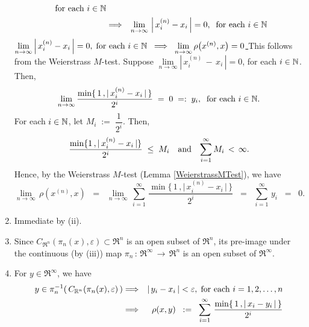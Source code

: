 \begin{enumerate}
\begin{eqnarray*}
		\;\;\textnormal{for each $i \in \mathbb{N}$}
	\\
	&\Longrightarrow& \underset{n\rightarrow\infty}{\lim}\,\left\vert\,x^{(n)}_{i} - x_{i}\,\right\vert = 0,
		\;\;\textnormal{for each $i \in \mathbb{N}$}
	\end{eqnarray*}
	\underline{$\underset{n\rightarrow\infty}{\lim}\left\vert\,x^{(n)}_{i} - x_{i}\,\right\vert = 0,\;
	\textnormal{for each $i \in \mathbb{N}$}
	\;\;\Longrightarrow\;\;
	\underset{n\rightarrow\infty}{\lim}\,\rho\!\left(x^{(n)},x\right) = 0$
	\;\mbox{}}
	\vskip 0.1cm
	\noindent
	This follows from the Weierstrass $M$-test.
	Suppose $\underset{n\rightarrow\infty}{\lim}\left\vert\,x^{(n)}_{i}\,-\,x_{i}\,\right\vert = 0$, for each $i \in \mathbb{N}$.
	Then,
	\begin{equation*}
	\lim_{n\rightarrow\infty}\dfrac{\min\{\,1\,,\vert\,x^{(n)}_{i} - x_{i}\,\vert\,\}}{2^{i}} \; = \; 0 \; =: \; y_{i},
	\;\;\textnormal{for each $i \in \mathbb{N}$}.
	\end{equation*}
	For each $i \in \mathbb{N}$, let $M_{i} \; := \; \dfrac{1}{2^{i}}$.
	Then,
	\begin{equation*}
	\dfrac{\min\{1\,,\vert\,x^{(n)}_{i} - x_{i}\,\vert\}}{2^{i}}\;\leq\;M_{i}
	\quad\textnormal{and}\quad
	\overset{\infty}{\underset{i=1}{\sum}}\,M_{i}\,<\,\infty.
	\end{equation*}
	Hence, by the Weierstrass $M$-test (Lemma \ref{WeierstrassMTest}), we have
	\begin{equation*}
 	\lim_{n\rightarrow\infty}\,\rho\!\left(x^{(n)},x\right)
	\;\; = \;\;
	\lim_{n\rightarrow\infty}\,\sum^{\infty}_{i=1}\,\dfrac{\min\{\,1\,,\vert\,x^{(n)}_{i} - x_{i}\,\vert\,\}}{2^{i}}
	\;\;=\;\; \sum^{\infty}_{i=1}\,y_{i} \;\; = \;\; 0.
	\end{equation*}
\item
	Immediate by (ii).	
\item
	Since $C_{\Re^{n}}(\pi_{n}(x),\varepsilon) \subset \Re^{n}$ is an open subset of $\Re^{n}$,
	its pre-image under the continuous (by (iii)) map
	$\pi_{n} \, : \, \Re^{\infty} \, \longrightarrow \, \Re^{n}$ is an open subset of $\Re^{\infty}$.
\item
	For $y \in \Re^{\infty}$, we have
	\begin{eqnarray*}
	y \in \pi_{n}^{-1}\!\left(\,C_{\Re^{n}}(\pi_{n}(x),\varepsilon)\,\right)
	&\Longrightarrow& \vert\,y_{i} - x_{i}\,\vert < \varepsilon, \;\textnormal{for each $i = 1, 2, \ldots, n$}
	\\
	&\Longrightarrow&
		\rho(x,y)
		\;\;:=\;\; \sum^{\infty}_{i=1}\,\dfrac{\min\{\,1\,,\vert\,x_{i} - y_{i}\,\vert\,\}}{2^{i}}

\end{eqnarray*}
\end{enumerate}
